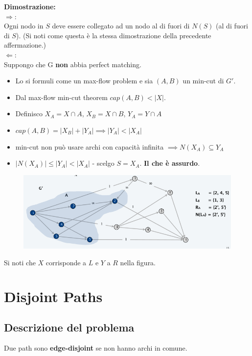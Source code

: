 \textbf{Dimostrazione:}\\
$\Rightarrow:$\\
Ogni nodo in $S$ deve essere
collegato ad un nodo al di fuori di $N(S)$ (al di fuori di $S$). (Si
noti come questa è la stessa dimostrazione della precedente
affermazione.)\\

$\Leftarrow:$\\
Suppongo che G \textbf{non} abbia perfect matching.
\begin{itemize}
	\item Lo si formuli come un max-flow problem e sia $(A,B)$ un min-cut di $G'$.
	\item Dal max-flow min-cut theorem $cap(A,B) < |X|$.
	\item Definisco $X_A = X \cap A$, $X_B = X \cap B$, $Y_A = Y \cap A$
	\item $cap(A,B) = |X_B| + |Y_A| \implies |Y_A| < |X_A|$
	\item min-cut non può usare archi con capacità infinita $\implies N(X_A) \subseteq Y_A$
	\item $|N(X_A)| \le |Y_A| < |X_A|$ - scelgo $S = X_A$. \textbf{Il che è assurdo}.
\end{itemize}

\begin{figure}[H]
	\centering
	\includegraphics[width = 12 cm]{capitoli/network_flow/imgs/bipartite3.png}
\end{figure}

Si noti che $X$ corrisponde a $L$ e $Y$ a $R$ nella figura.

\section{Disjoint Paths}

\subsection{Descrizione del problema}

Due path sono \textbf{edge-disjoint} se non hanno archi in comune.\\

